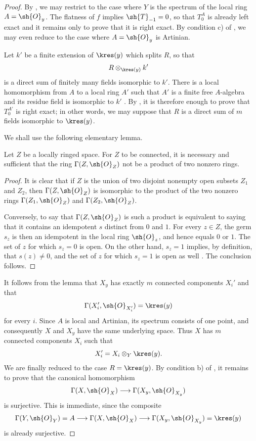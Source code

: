 \begin{proof}
By , we may restrict to the case where
$Y$ is the spectrum of the local ring $A=\sh{O}_y$.
The flatness of $f$ implies $\sh{T}_{-1}=0$, so that
$T_0^A$ is already left exact and it remains only to prove
that it is right exact.  By condition c) of
, we may even reduce to the case where
$A=\sh{O}_y$ is Artinian.

Let $k'$ be a finite extension of $\kres(y)$ which splits
$R$, so that
\[
  R\otimes_{\kres(y)}k'
\]
is a direct sum of finitely many fields isomorphic to $k'$.
There is a local homomorphism from $A$ to a local ring
$A'$ such that $A'$ is a finite free $A$-algebra and its
residue field is isomorphic to $k'$ .
By , it is therefore enough to prove that
$T_0^{A'}$ is right exact; in other words, we may suppose
that $R$ is a direct sum of $m$ fields isomorphic to
$\kres(y)$.

We shall use the following elementary lemma.

\begin{lemma}[7.8.6.1]
\label{III.7.8.6.1}
Let $Z$ be a locally ringed space.  For $Z$ to be connected,
it is necessary and sufficient that the ring
$\Gamma(Z,\sh{O}_Z)$ not be a product of two nonzero rings.
\end{lemma}

\begin{proof}
It is clear that if $Z$ is the union of two disjoint
nonempty open subsets $Z_1$ and $Z_2$, then
$\Gamma(Z,\sh{O}_Z)$ is isomorphic to the product of the
two nonzero rings $\Gamma(Z_1,\sh{O}_Z)$ and
$\Gamma(Z_2,\sh{O}_Z)$.

Conversely, to say that $\Gamma(Z,\sh{O}_Z)$ is such a
product is equivalent to saying that it contains an
idempotent $s$ distinct from $0$ and $1$.  For every
$z\in Z$, the germ $s_z$ is then an idempotent in the local
ring $\sh{O}_z$, and hence equals $0$ or $1$.  The set of
$z$ for which $s_z=0$ is open.  On the other hand,
$s_z=1$ implies, by definition, that $s(z)\ne0$, and the
set of $z$ for which $s_z=1$ is open as well
.  The conclusion follows.
\end{proof}

It follows from the lemma that $X_y$ has exactly $m$
connected components $X_i'$ and that
\[
  \Gamma(X_i',\sh{O}_{X_i'})=\kres(y)
\]
for every $i$.  Since $A$ is local and Artinian, its
spectrum consists of one point, and consequently $X$ and
$X_y$ have the same underlying space.  Thus $X$ has $m$
connected components $X_i$ such that
\[
  X_i'=X_i\otimes_Y\kres(y).
\]
We are finally reduced to the case $R=\kres(y)$.  By
condition b) of , it remains to prove that
the canonical homomorphism
\[
  \Gamma(X,\sh{O}_X)\longrightarrow
  \Gamma(X_y,\sh{O}_{X_y})
\]
is surjective.  This is immediate, since the composite
\[
  \Gamma(Y,\sh{O}_Y)=A
  \longrightarrow\Gamma(X,\sh{O}_X)
  \longrightarrow\Gamma(X_y,\sh{O}_{X_y})=\kres(y)
\]
is already surjective.
\end{proof}

